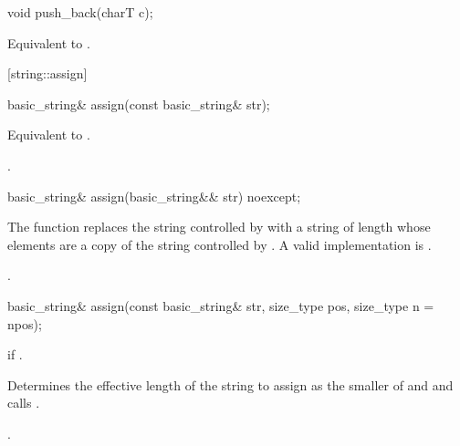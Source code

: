 %
%
\begin{itemdecl}
void push_back(charT c);
\end{itemdecl}

\begin{itemdescr}
\pnum
\effects
Equivalent to
.
\end{itemdescr}

[string::assign]{}

%
%
\begin{itemdecl}
basic_string& assign(const basic_string& str);
\end{itemdecl}

\begin{itemdescr}
\pnum
\effects Equivalent to .

\pnum
\returns
{}.
\end{itemdescr}

%
%
\begin{itemdecl}
basic_string& assign(basic_string&& str) noexcept;
\end{itemdecl}

\begin{itemdescr}
\pnum
\effects The function replaces the string controlled by
with a string of length  whose elements are a copy of the
string controlled by .
\enternote A valid implementation is
. \exitnote

\pnum
\returns
{}.
\end{itemdescr}


%
%
\begin{itemdecl}
basic_string&
  assign(const basic_string& str, size_type pos,
         size_type n = npos);
\end{itemdecl}

\begin{itemdescr}
\pnum
\requires
{}

\pnum
\throws
{}
if
.

\pnum
\effects
Determines the effective length 
of the string to assign as the smaller of  and
 and calls
.

\pnum
\returns
{}.
\end{itemdescr}

